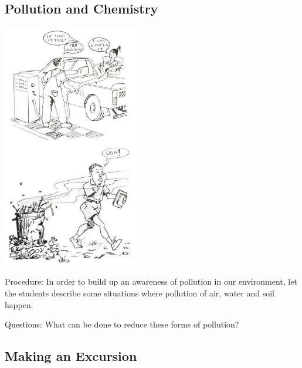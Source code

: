 \begin{multicols}{2}
\vfill
\columnbreak


\subsection{Pollution and Chemistry} 

\begin{center}
\includegraphics[width=0.45\textwidth]{./img/source/chemical-pollution.jpg}
\end{center}

\begin{description*}
\item[Procedure:]{In order to build up an awareness of pollution
in our environment, let the students describe
some situations where pollution of air, water
and soil happen.}
\item[Questions:]{What can be done to reduce these forms of pollution?}
\end{description*}

\subsection{Making an Excursion}


\end{multicols}
